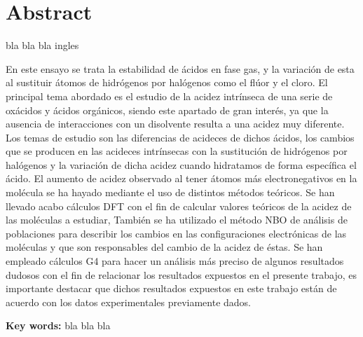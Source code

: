 
\chapter*{Abstract} 


   bla bla bla ingles

En este ensayo se trata la estabilidad de ácidos en fase gas, y la variación de esta al sustituir átomos de hidrógenos por halógenos como el flúor y el cloro. El principal tema abordado es el estudio de la acidez intrínseca de una serie de oxácidos y ácidos orgánicos, siendo este apartado de gran interés, ya que la ausencia de interacciones con un disolvente resulta a una acidez muy diferente.
 Los temas de estudio son las diferencias de acideces de dichos ácidos, los cambios que se producen en las acideces intrínsecas con la sustitución de hidrógenos por halógenos y la variación de dicha acidez cuando hidratamos de forma específica el ácido. El aumento de acidez observado al tener átomos más electronegativos en la molécula se ha hayado mediante el uso de distintos métodos teóricos. Se han llevado acabo cálculos DFT con el fin de calcular valores teóricos de la acidez de las moléculas a estudiar, También se ha utilizado el método NBO de análisis de poblaciones para describir los cambios en las configuraciones electrónicas de las moléculas y que son responsables del cambio de la acidez de éstas. Se han empleado cálculos G4 para hacer un análisis más preciso de algunos resultados dudosos con el fin de relacionar los resultados expuestos en el presente trabajo, es importante destacar que dichos resultados expuestos en este trabajo están de acuerdo con los datos experimentales previamente dados.


\vspace{5mm}
\textbf{Key words:} bla bla bla